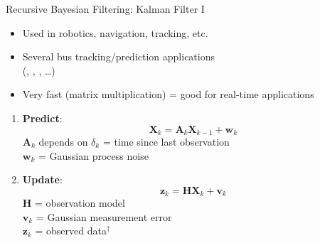 \documentclass[10pt,t]{beamer}
\newcommand{\bX}{\mathbf{X}}
\newcommand{\mat}[1]{\mathbf{#1}}
\renewcommand{\vec}[1]{\boldsymbol{#1}}
\begin{document}
\begin{frame}{Recursive Bayesian Filtering: Kalman Filter I}
  \onslide<+->
  \begin{itemize}%
    \item Used in robotics, navigation, tracking, etc.

    \item Several bus tracking/prediction applications\\
      (\cite{wall-dailey:1999}, \cite{dailey:2001}, \cite{cathey-dailey:2003}, \ldots)

    \item Very fast (matrix multiplication) = good for real-time applications
    \end{itemize}


    \begin{enumerate}[<+->]
    \item \textbf{Predict}:
      \begin{equation*}
        \bX_k = \mat{A}_k \bX_{k-1} + \vec{w}_k
      \end{equation*}
      $\mat{A}_k$ depends on $\delta_k$ = time since last observation\\
      $\vec{w}_k$ = Gaussian process noise
    \item \textbf{Update}:
      \begin{equation*}
        \vec{z}_k = \mat{H} \bX_k + \vec{v}_k
      \end{equation*}
      $\mat{H} $ = observation model\\
      $\vec{v}_k$ = Gaussian measurement error\\
      $\vec{z}_k$ = observed data$^\dagger$
    \end{enumerate}

\end{frame}
\end{document}
